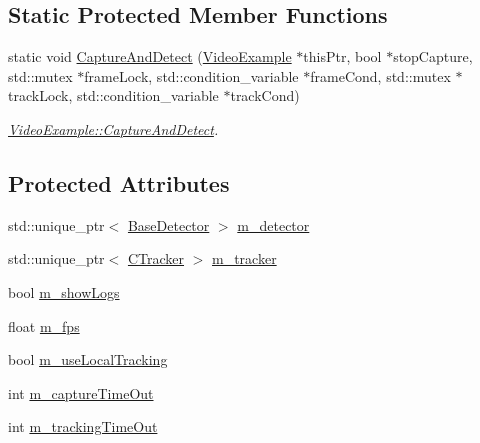 \subsection*{Static Protected Member Functions}
\begin{DoxyCompactItemize}
\item 
static void \mbox{\hyperlink{class_video_example_ace8617201da40b6e230bd6c049b48aa0}{Capture\+And\+Detect}} (\mbox{\hyperlink{class_video_example}{Video\+Example}} $\ast$this\+Ptr, bool $\ast$stop\+Capture, std\+::mutex $\ast$frame\+Lock, std\+::condition\+\_\+variable $\ast$frame\+Cond, std\+::mutex $\ast$track\+Lock, std\+::condition\+\_\+variable $\ast$track\+Cond)
\begin{DoxyCompactList}\small\item\em \mbox{\hyperlink{class_video_example_ace8617201da40b6e230bd6c049b48aa0}{Video\+Example\+::\+Capture\+And\+Detect}}. \end{DoxyCompactList}\end{DoxyCompactItemize}
\subsection*{Protected Attributes}
\begin{DoxyCompactItemize}
\item 
std\+::unique\+\_\+ptr$<$ \mbox{\hyperlink{class_base_detector}{Base\+Detector}} $>$ \mbox{\hyperlink{class_video_example_a00fee4b18b68d605b87051f3bdaa1c92}{m\+\_\+detector}}
\item 
std\+::unique\+\_\+ptr$<$ \mbox{\hyperlink{class_c_tracker}{C\+Tracker}} $>$ \mbox{\hyperlink{class_video_example_a7c58cd8c883981b2e645d1a3d8edf76a}{m\+\_\+tracker}}
\item 
bool \mbox{\hyperlink{class_video_example_af3bfe51e3e1452bb084016602c668463}{m\+\_\+show\+Logs}}
\item 
float \mbox{\hyperlink{class_video_example_ae8110012f8d57f39d6355377cf20fb27}{m\+\_\+fps}}
\item 
bool \mbox{\hyperlink{class_video_example_a951ee017c4fbb180dfc965a9a35ac69f}{m\+\_\+use\+Local\+Tracking}}
\item 
int \mbox{\hyperlink{class_video_example_aea3c9dd66a3464fab8c61a838aff0ccf}{m\+\_\+capture\+Time\+Out}}
\item 
int \mbox{\hyperlink{class_video_example_a47c8dd1d6ec7e8e18a8f7d92536c53a2}{m\+\_\+tracking\+Time\+Out}}
\end{DoxyCompactItemize}
